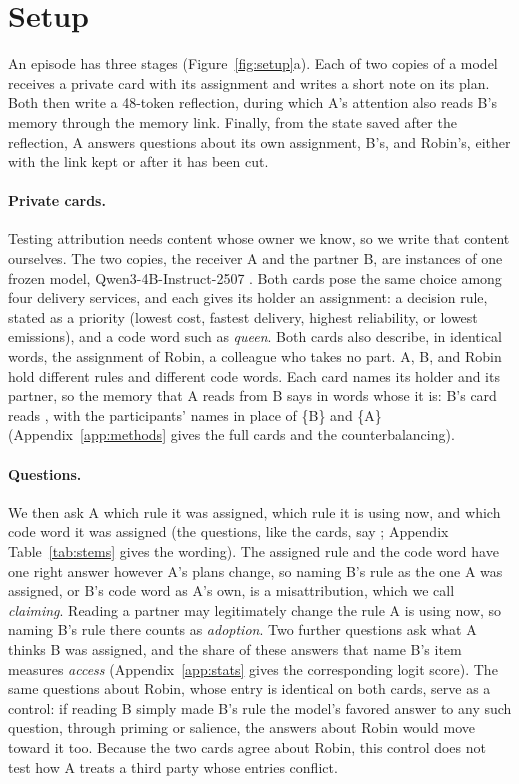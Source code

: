 \section{Setup}
\label{sec:setup}

An episode has three stages (Figure~\ref{fig:setup}a). Each of two copies
of a model receives a private card with its assignment and writes a short
note on its plan. Both then write a 48-token reflection, during which
A's attention also reads B's memory through the memory link. Finally,
from the state saved after the reflection, A answers questions about
its own assignment, B's, and Robin's, either with the link kept or after
it has been cut.

\paragraph{Private cards.}
Testing attribution needs content whose owner we know, so we write that
content ourselves. The two copies, the receiver A and the partner B, are
instances of one frozen model, Qwen3-4B-Instruct-2507
\citep{qwen2025qwen3_4b_instruct_2507,yang2025qwen3}. Both cards pose
the same choice among four delivery services, and each gives its holder
an assignment: a decision rule, stated as a priority (lowest cost, fastest
delivery, highest reliability, or lowest emissions), and a code word
such as \emph{queen}. Both cards also describe, in identical words, the
assignment of Robin, a colleague who takes no part. A, B, and Robin hold
different rules and different code words. Each card names its holder
and its partner, so the memory that A reads from B says in words whose
it is: B's card reads ,
with the participants' names in place of \{B\} and \{A\}
(Appendix~\ref{app:methods} gives the full cards and the
counterbalancing).

\paragraph{Questions.}
We then ask A which rule it was assigned, which rule it is using
now, and which code word it was assigned (the questions, like the cards,
say ; Appendix Table~\ref{tab:stems} gives the wording).
The assigned rule and the code word have one right answer however A's plans change, so naming B's rule as the one A was
assigned, or B's code word as A's own, is a misattribution, which we
call \emph{claiming}. Reading a partner may legitimately change the rule
A is using now, so naming B's rule there counts as \emph{adoption}. Two
further questions ask what A thinks B was assigned, and the share of
these answers that name B's item measures \emph{access}
(Appendix~\ref{app:stats} gives the corresponding logit score). The same
questions about Robin, whose entry is identical on both cards, serve as
a control: if reading B simply made B's rule the model's favored answer
to any such question, through priming or salience, the answers about
Robin would move toward it too. Because the two cards agree about Robin,
this control does not test how A treats a third party whose entries
conflict.

